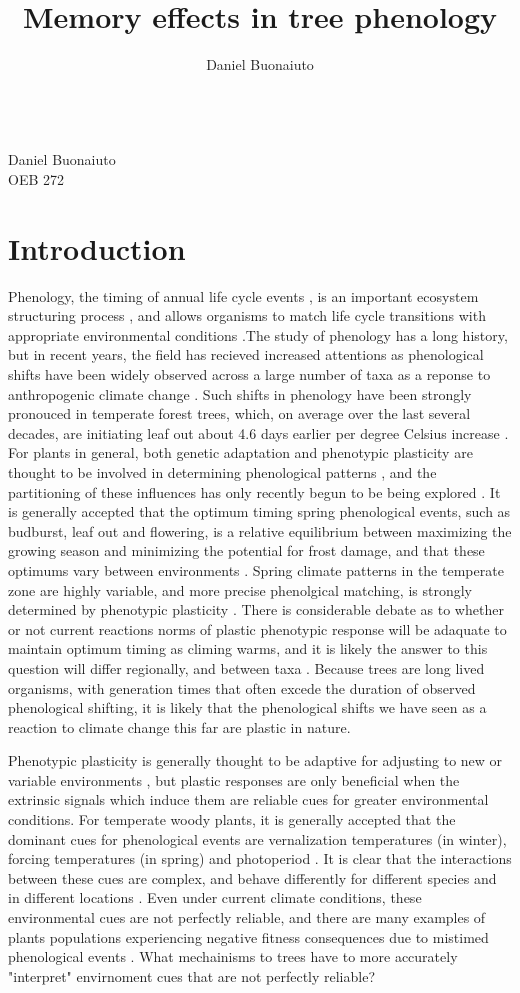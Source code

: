 \documentclass{article}\usepackage[]{graphicx}\usepackage[]{color}
\begin{document}
\title{Memory effects in tree phenology}
\author{Daniel Buonaiuto}
\data{\today}\\
Daniel Buonaiuto\\
OEB 272
\section*{Introduction}
\par Phenology, the timing of annual life cycle events \citep{}, is an important ecosystem structuring process \citep{}, and allows organisms to match life cycle transitions with appropriate environmental conditions \citep{}.The study of phenology has a long history, but in recent years, the field has recieved increased attentions as phenological shifts have been widely observed across a large number of taxa as a reponse to anthropogenic climate change \citep{Menzel2006}. Such shifts in phenology have been strongly pronouced in temperate forest trees, which, on average over the last several decades, are initiating leaf out about 4.6 days earlier per degree Celsius increase \citep{Polgar2014, Wolkovich2012}. For plants in general, both genetic adaptation and phenotypic plasticity are thought to be involved in determining phenological patterns \citep{}, and the partitioning of these influences has only recently begun to be being explored \citep{}. It is generally accepted that the optimum timing spring phenological events, such as budburst, leaf out and flowering, is a relative equilibrium between maximizing the growing season and minimizing the potential for frost damage, and that these optimums vary between environments \citep{Kramer1995}. Spring climate patterns in the temperate zone are highly variable, and more precise phenolgical matching, is strongly determined by phenotypic plasticity \citep{}. There is considerable debate as to whether or not current reactions norms of plastic phenotypic response will be adaquate to maintain optimum timing as climing warms, and it is likely the answer to this question will differ regionally, and between taxa \citep{}. Because trees are long lived organisms, with generation times that often excede the duration of observed phenological shifting, it is likely that the phenological shifts we have seen as a reaction to climate change this far are plastic in nature.
\par  Phenotypic plasticity is generally thought to be adaptive for adjusting to new or variable environments \citep{}, but plastic responses are only beneficial when the extrinsic signals which induce them are reliable cues for greater environmental conditions. For temperate woody plants, it is generally accepted that the dominant cues for phenological events are vernalization temperatures (in winter), forcing temperatures (in spring) and photoperiod \citep{}. It is clear that the interactions between these cues are complex, and behave differently for different species and in different locations \citep{}. Even under current climate conditions, these environmental cues are not perfectly reliable, and there are many examples of plants populations experiencing negative fitness consequences due to mistimed phenological events \cite{Inouye2008}. What mechainisms to trees have to more accurately "interpret" envirnoment cues that are not perfectly reliable?
\end{document}
